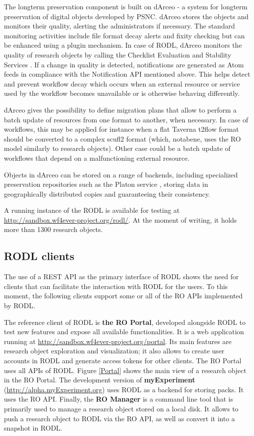The longterm preservation component is built on dArceo \cite{dArceo} - a system for longterm preservation of digital objects developed by PSNC. dArceo stores the objects and monitors their quality, alerting the administrators if necessary. The standard monitoring activities include file format decay alerts and fixity checking but can be enhanced using a plugin mechanism. In case of RODL, dArceo monitors the quality of research objects by calling the Checklist Evaluation and Stability Services \cite{Checklist-API,Stability-API}. If a change in quality is detected, notifications are generated as Atom feeds in compliance with the Notification API mentioned above. This helps detect and prevent workflow decay which occurs when an external resource or service used by the workflow becomes unavailable or is otherwise behaving differently.

dArceo gives the possibility to define migration plans that allow to perform a batch update of resources from one format to another, when necessary. In case of workflows, this may be applied for instance when a flat Taverna t2flow format should be converted to a complex scufl2 format (which, notabene, uses the RO model similarly to research objects). Other case could be a batch update of workflows that depend on a malfunctioning external resource.

Objects in dArceo can be stored on a range of backends, including specialized preservation repositories such as the Platon service \cite{Platon}, storing data in geographically distributed copies and guaranteeing their consistency.

A running instance of the RODL is available for testing at \url{http://sandbox.wf4ever-project.org/rodl/}. At the moment of writing, it holds more than 1300 research objects.

\subsection{RODL clients}

The use of a REST API as the primary interface of RODL shows the need for clients that can facilitate the interaction with RODL for the users. To this moment, the following clients support some or all of the RO APIs implemented by RODL.

The reference client of RODL is \textbf{the RO Portal}, developed alongside RODL to test new features and expose all available functionalities. It is a web application running at \url{http://sandbox.wf4ever-project.org/portal}. Its main features are research object exploration and visualization; it also allows to create user accounts in RODL and generate access tokens for other clients. The RO Portal uses all APIs of RODL. Figure \ref{Portal} shows the main view of a research object in the RO Portal. The development version of \textbf{myExperiment} \cite{myExperiment} (\url{http://alpha.myExperiment.org}) uses RODL as a backend for storing packs. It uses the RO API. Finally, the \textbf{RO Manager} \cite{RO-Manager} is a command line tool that is primarily used to manage a research object stored on a local disk. It allows to push a research object to RODL via the RO API, as well as convert it into a snapshot in RODL.
